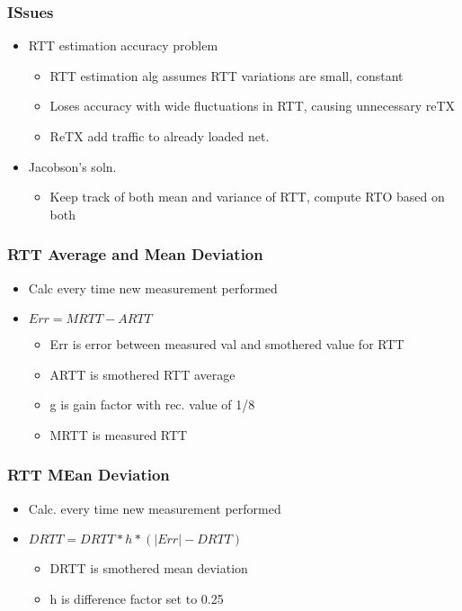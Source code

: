 \subsubsection{ISsues}
\begin{itemize}
	\item RTT estimation accuracy problem
	\begin{itemize}
		\item RTT estimation alg assumes RTT variations are small,
			constant
		\item Loses accuracy with wide fluctuations in RTT, causing
			unnecessary reTX
		\item ReTX add traffic to already loaded net.
	\end{itemize}
	\item Jacobson's soln.
	\begin{itemize}
		\item Keep track of both mean and variance of RTT, compute RTO
			based on both
	\end{itemize}
\end{itemize}
\subsubsection{RTT Average and Mean Deviation}
\begin{itemize}
	\item Calc every time new measurement performed
	\item $Err = MRTT - ARTT$
	\begin{itemize}
		\item Err is error between measured val and smothered value for
			RTT
		\item ARTT is smothered RTT average
		\item g is gain factor with rec. value of 1/8
		\item MRTT is measured RTT
	\end{itemize}
\end{itemize}
\subsubsection{RTT MEan Deviation}
\begin{itemize}
	\item Calc. every time new measurement performed
	\item $DRTT = DRTT*h*(|Err|-DRTT)$
	\begin{itemize}
		\item DRTT is smothered mean deviation
		\item h is difference factor set to 0.25
	\end{itemize}
\end{itemize}

